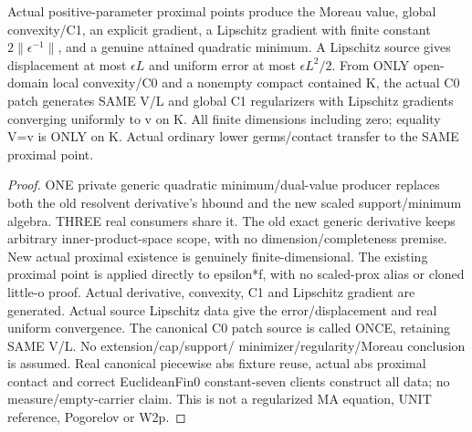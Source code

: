 \begin{lemma}
  \label{lem:moreau-regularization}
  \leanok
  Actual positive-parameter proximal points produce the Moreau value, global
  convexity/C1, an explicit gradient, a Lipschitz gradient with finite constant
  $2\lVert\epsilon^{-1}\rVert$, and a genuine attained quadratic minimum.
  A Lipschitz source gives displacement at most $\epsilon L$ and uniform error
  at most $\epsilon L^2/2$. From ONLY open-domain local convexity/C0 and a
  nonempty compact contained K, the actual C0 patch generates SAME V/L and
  global C1 regularizers with Lipschitz gradients converging uniformly to v
  on K. All finite dimensions including zero; equality V=v is ONLY on K.
  Actual ordinary lower germs/contact transfer to the SAME proximal point.
\end{lemma}
\begin{proof}
  \leanok
  ONE private generic quadratic minimum/dual-value producer replaces both
  the old resolvent derivative's hbound and the new scaled support/minimum
  algebra. THREE real consumers share it. The old exact generic derivative
  keeps arbitrary inner-product-space scope, with no dimension/completeness
  premise. New actual proximal existence is genuinely finite-dimensional.
  The existing proximal point is applied directly to epsilon*f, with no
  scaled-prox alias or cloned little-o proof. Actual derivative, convexity,
  C1 and Lipschitz gradient are generated. Actual source Lipschitz data give
  the error/displacement and real uniform convergence. The canonical C0
  patch source is called ONCE, retaining SAME V/L. No extension/cap/support/
  minimizer/regularity/Moreau conclusion is assumed. Real canonical piecewise
  abs fixture reuse, actual abs proximal contact and correct EuclideanFin0
  constant-seven clients construct all data; no measure/empty-carrier claim.
  This is not a regularized MA equation, UNIT reference, Pogorelov or W2p.
\end{proof}

